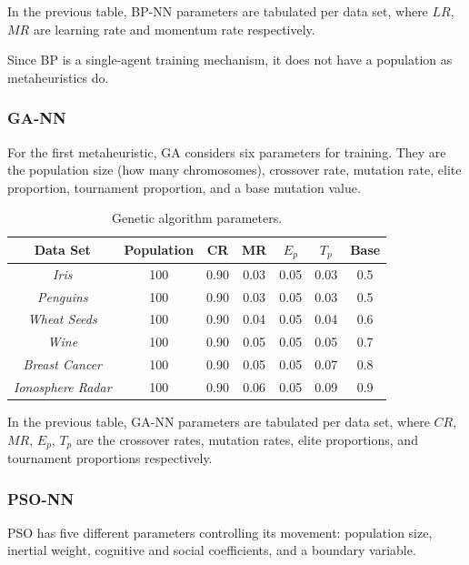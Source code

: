 \documentclass[a4paper,12pt]{article}
\begin{document}
In the previous table, BP-NN parameters are tabulated per data set, where $LR$, $MR$ are learning rate and momentum rate respectively.

Since BP is a single-agent training mechanism, it does not have a population as metaheuristics do.

\subsubsection{GA-NN}

For the first metaheuristic, GA considers six parameters for training. They are the population size (how many chromosomes), crossover rate, mutation rate, elite proportion, tournament proportion, and a base mutation value.

\begin{table}[h!]
\centering
\begin{tabular}{|c|c|c|c|c|c|c|}
\hline
\textbf{Data Set} & \textbf{Population} & \textbf{CR} & \textbf{MR} & \textbf{$E_p$} & \textbf{$T_p$} & \textbf{Base} \\ \hline
\textit{Iris} & 100 & 0.90 & 0.03 & 0.05 & 0.03 & 0.5 \\ \hline
\textit{Penguins} & 100 & 0.90 & 0.03 & 0.05 & 0.03 & 0.5 \\ \hline
\textit{Wheat Seeds} & 100 & 0.90 & 0.04 & 0.05 & 0.04 & 0.6 \\ \hline
\textit{Wine} & 100 & 0.90 & 0.05 & 0.05 & 0.05 & 0.7 \\ \hline
\textit{Breast Cancer} & 100 & 0.90 & 0.05 & 0.05 & 0.07 & 0.8 \\ \hline
\textit{Ionosphere Radar} & 100 & 0.90 & 0.06 & 0.05 & 0.09 & 0.9 \\ \hline
\end{tabular}
\caption{Genetic algorithm parameters.}
\label{Tab:ga-par}
\end{table}

In the previous table, GA-NN parameters are tabulated per data set, where $CR$, $MR$, $E_p$, $T_p$ are the crossover rates, mutation rates, elite proportions, and tournament proportions respectively.

\subsubsection{PSO-NN}

PSO has five different parameters controlling its movement: population size, inertial weight, cognitive and social coefficients, and a boundary variable.
\end{document}
